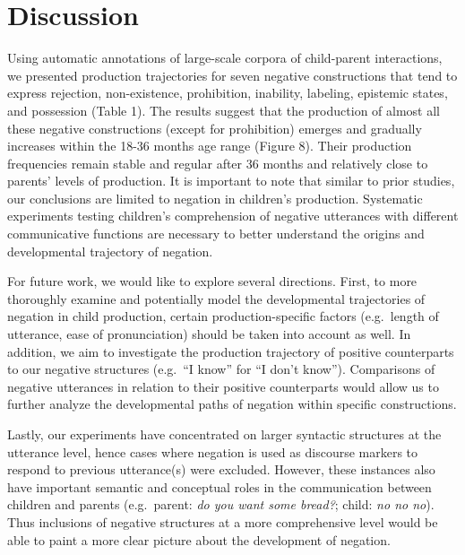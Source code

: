 \documentclass[
  english,
  man,floatsintext]{apa6}
\begin{document}
\hypertarget{discussion}{%
\section{Discussion}\label{discussion}}

Using automatic annotations of large-scale corpora of child-parent interactions, we presented production trajectories for seven negative constructions that tend to express rejection, non-existence, prohibition, inability, labeling, epistemic states, and possession (Table 1). The results suggest that the production of almost all these negative constructions (except for prohibition) emerges and gradually increases within the 18-36 months age range (Figure 8). Their production frequencies remain stable and regular after 36 months and relatively close to parents' levels of production. It is important to note that similar to prior studies, our conclusions are limited to negation in children's production. Systematic experiments testing children's comprehension of negative utterances with different communicative functions are necessary to better understand the origins and developmental trajectory of negation.

For future work, we would like to explore several directions. First, to more thoroughly examine and potentially model the developmental trajectories of negation in child production, certain production-specific factors (e.g.~length of utterance, ease of pronunciation) should be taken into account as well. In addition, we aim to investigate the production trajectory of positive counterparts to our negative structures (e.g.~\enquote{I know} for \enquote{I don't know}). Comparisons of negative utterances in relation to their positive counterparts would allow us to further analyze the developmental paths of negation within specific constructions.

Lastly, our experiments have concentrated on larger syntactic structures at the utterance level, hence cases where negation is used as discourse markers to respond to previous utterance(s) were excluded. However, these instances also have important semantic and conceptual roles in the communication between children and parents (e.g.~parent: \emph{do you want some bread?}; child: \emph{no no no}). Thus inclusions of negative structures at a more comprehensive level would be able to paint a more clear picture about the development of negation.

\begingroup
\setlength{\parindent}{-0.5in}
\setlength{\leftskip}{0.5in}
\end{document}
